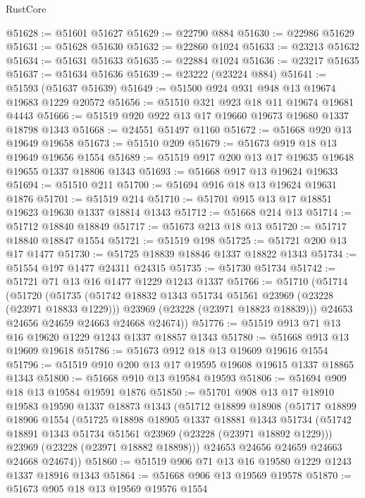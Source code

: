 \begin{lexlean}{RustCore}
\begin{coremodule}
@51628 := @51601 @51627
@51629 := @22790 @884
@51630 := @22986 @51629
@51631 := @51628 @51630
@51632 := @22860 @1024
@51633 := @23213 @51632
@51634 := @51631 @51633
@51635 := @22884 @1024
@51636 := @23217 @51635
@51637 := @51634 @51636
@51639 := @23222 (@23224 @884)
@51641 := @51593 (@51637 @51639)
@51649 := @51500 @924 @931 @948 @13 @19674 @19683 @1229 @20572
@51656 := @51510 @321 @923 @18 @11 @19674 @19681 @4443
@51666 := @51519 @920 @922 @13 @17 @19660 @19673 @19680 @1337 @18798 @1343
@51668 := @24551 @51497 @1160
@51672 := @51668 @920 @13 @19649 @19658
@51673 := @51510 @209
@51679 := @51673 @919 @18 @13 @19649 @19656 @1554
@51689 := @51519 @917 @200 @13 @17 @19635 @19648 @19655 @1337 @18806 @1343
@51693 := @51668 @917 @13 @19624 @19633
@51694 := @51510 @211
@51700 := @51694 @916 @18 @13 @19624 @19631 @1876
@51701 := @51519 @214
@51710 := @51701 @915 @13 @17 @18851 @19623 @19630 @1337 @18814 @1343
@51712 := @51668 @214 @13
@51714 := @51712 @18840 @18849
@51717 := @51673 @213 @18 @13
@51720 := @51717 @18840 @18847 @1554
@51721 := @51519 @198
@51725 := @51721 @200 @13 @17 @1477
@51730 := @51725 @18839 @18846 @1337 @18822 @1343
@51734 := @51554 @197 @1477 @24311 @24315
@51735 := @51730 @51734
@51742 := @51721 @71 @13 @16 @1477 @1229 @1243 @1337
@51766 := @51710
    (@51714
      (@51720
        (@51735
          (@51742 @18832 @1343 @51734 @51561 @23969 (@23228 (@23971 @18833 @1229)))
          @23969
          (@23228 (@23971 @18823 @18839)))
        @24653
        @24656
        @24659
        @24663
        @24668
        @24674))
@51776 := @51519 @913 @71 @13 @16 @19620 @1229 @1243 @1337 @18857 @1343
@51780 := @51668 @913 @13 @19609 @19618
@51786 := @51673 @912 @18 @13 @19609 @19616 @1554
@51796 := @51519 @910 @200 @13 @17 @19595 @19608 @19615 @1337 @18865 @1343
@51800 := @51668 @910 @13 @19584 @19593
@51806 := @51694 @909 @18 @13 @19584 @19591 @1876
@51850 := @51701
    @908
    @13
    @17
    @18910
    @19583
    @19590
    @1337
    @18873
    @1343
    (@51712
      @18899
      @18908
      (@51717
        @18899
        @18906
        @1554
        (@51725
          @18898
          @18905
          @1337
          @18881
          @1343
          @51734
          (@51742 @18891 @1343 @51734 @51561 @23969 (@23228 (@23971 @18892 @1229)))
          @23969
          (@23228 (@23971 @18882 @18898)))
        @24653
        @24656
        @24659
        @24663
        @24668
        @24674))
@51860 := @51519 @906 @71 @13 @16 @19580 @1229 @1243 @1337 @18916 @1343
@51864 := @51668 @906 @13 @19569 @19578
@51870 := @51673 @905 @18 @13 @19569 @19576 @1554

\end{coremodule}
\end{lexlean}
